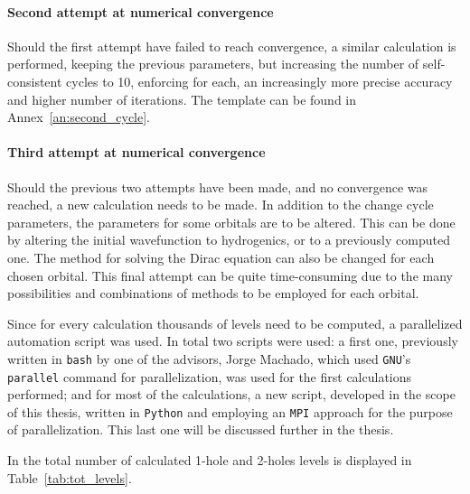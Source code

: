 \paragraph{Second attempt at numerical convergence}
Should the first attempt have failed to reach convergence, a similar calculation is performed, keeping the previous parameters, but increasing the number of self-consistent cycles to 10, enforcing for each, an increasingly more precise accuracy and higher number of iterations. The template can be found in Annex~\ref{an:second_cycle}.


\paragraph{Third attempt at numerical convergence}
Should the previous two attempts have been made, and no convergence was reached, a new calculation needs to be made. In addition to the change cycle parameters, the parameters for some orbitals are to be altered. This can be done by altering the initial wavefunction to hydrogenics, or to a previously computed one. The method for solving the Dirac equation can also be changed for each chosen orbital. This final attempt can be quite time-consuming due to the many possibilities and combinations of methods to be employed for each orbital.


Since for every calculation thousands of levels need to be computed, a parallelized automation script was used. In total two scripts were used: a first one, previously written in \verb|bash| by one of the advisors, Jorge Machado, which used \verb|GNU|'s \verb|parallel|  command  for parallelization, was used for the first calculations performed; and for most of the calculations, a new script, developed in the scope of this thesis, written in \verb|Python| and employing an \verb|MPI| approach for the purpose of parallelization. This last one will be discussed further in the thesis.

In the total number of calculated 1-hole and 2-holes levels is displayed in Table~\ref{tab:tot_levels}.

